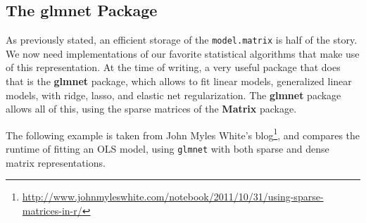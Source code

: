 \documentclass[]{book}
\renewcommand{\href}[2]{#2\footnote{\url{#1}}}
\theoremstyle{definition}
\theoremstyle{definition}
\theoremstyle{definition}
\theoremstyle{remark}
\begin{document}
\hypertarget{the-glmnet-package}{%
\subsection{The glmnet Package}\label{the-glmnet-package}}

As previously stated, an efficient storage of the \texttt{model.matrix} is half of the story.
We now need implementations of our favorite statistical algorithms that make use of this representation.
At the time of writing, a very useful package that does that is the \textbf{glmnet} package, which allows to fit linear models, generalized linear models, with ridge, lasso, and elastic net regularization.
The \textbf{glmnet} package allows all of this, using the sparse matrices of the \textbf{Matrix} package.

The following example is taken from \href{http://www.johnmyleswhite.com/notebook/2011/10/31/using-sparse-matrices-in-r/}{John Myles White's blog}, and compares the runtime of fitting an OLS model, using \texttt{glmnet} with both sparse and dense matrix representations.
\end{document}
